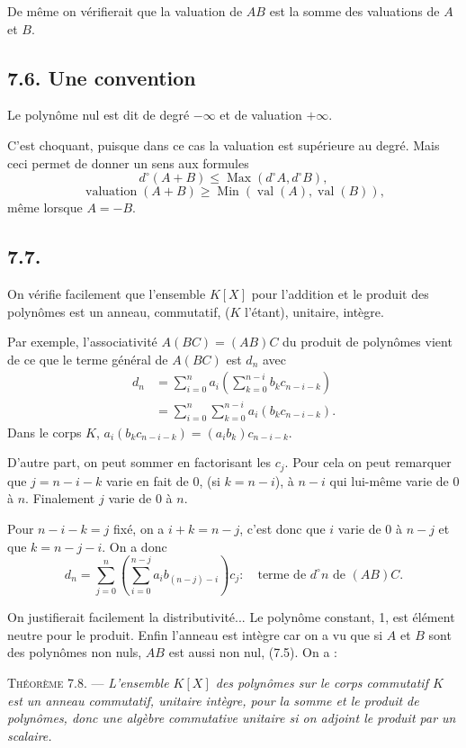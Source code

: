 De même on vérifierait que la valuation de $AB$ est la somme des valuations de $A$ et $B$.

\subsection*{7.6. Une convention}

Le polynôme nul est dit de degré $-\infty$ et de valuation $+\infty$.

C'est choquant, puisque dans ce cas la valuation est supérieure au degré. Mais ceci permet de donner un sens aux formules
\[
d^\circ(A+B)\le \operatorname{Max}(d^\circ A,d^\circ B),
\]
\[
\operatorname{valuation}(A+B)\ge \operatorname{Min}(\operatorname{val}(A),\operatorname{val}(B)),
\]
même lorsque $A=-B$.

\subsection*{7.7.}

On vérifie facilement que l'ensemble $K[X]$ pour l'addition et le produit des polynômes est un anneau, commutatif, ($K$ l'étant), unitaire, intègre.

Par exemple, l'associativité $A(BC)=(AB)C$ du produit de polynômes vient de ce que le terme général de $A(BC)$ est $d_n$ avec
\[
\begin{aligned}
d_n&=\sum_{i=0}^n a_i\left(\sum_{k=0}^{n-i}b_kc_{n-i-k}\right)\\
&=\sum_{i=0}^n\sum_{k=0}^{n-i}a_i(b_kc_{n-i-k}).
\end{aligned}
\]
Dans le corps $K$, $a_i(b_kc_{n-i-k})=(a_ib_k)c_{n-i-k}$.

D'autre part, on peut sommer en factorisant les $c_j$. Pour cela on peut remarquer que $j=n-i-k$ varie en fait de 0, (si $k=n-i$), à $n-i$ qui lui-même varie de 0 à $n$. Finalement $j$ varie de 0 à $n$.

Pour $n-i-k=j$ fixé, on a $i+k=n-j$, c'est donc que $i$ varie de 0 à $n-j$ et que $k=n-j-i$. On a donc
\[
d_n=\sum_{j=0}^n\left(\sum_{i=0}^{n-j}a_i b_{(n-j)-i}\right)c_j :\quad\text{terme de }d^\circ n\text{ de }(AB)C.
\]

On justifierait facilement la distributivité... Le polynôme constant, 1, est élément neutre pour le produit. Enfin l'anneau est intègre car on a vu que si $A$ et $B$ sont des polynômes non nuls, $AB$ est aussi non nul, (7.5). On a :

\medskip\noindent\textsc{Théorème 7.8.} --- \emph{L'ensemble $K[X]$ des polynômes sur le corps commutatif $K$ est un anneau commutatif, unitaire intègre, pour la somme et le produit de polynômes, donc une algèbre commutative unitaire si on adjoint le produit par un scalaire.} \bookend

